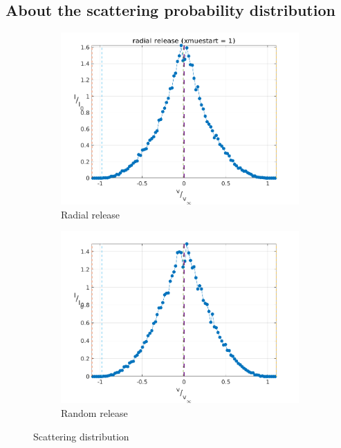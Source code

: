 \documentclass[../main/main.tex]{subfiles}
\begin{document}
\subsection{About the scattering probability distribution}
\begin{figure}[!htbp]
\hspace*{-0.5in}
\centering
\begin{subfigure}{.6\textwidth}
\includegraphics[width=1\textwidth]{../../two_resonance_lines/figures/scattering_distribution_radial_release.png}
\caption{Radial release}
\end{subfigure}%
\begin{subfigure}{.6\textwidth}
\includegraphics[width=1\textwidth]{../../two_resonance_lines/figures/scattering_distribution_random_release.png}
\caption{Random release}
\end{subfigure}
\caption{Scattering distribution}
\label{PCyg_mu_eq_1}
\end{figure}
\end{document}
